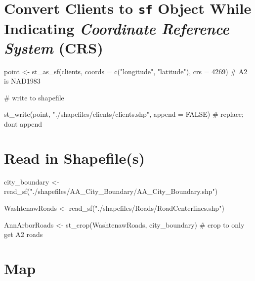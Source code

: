 \documentclass[
  letterpaper,
  DIV=11,
  numbers=noendperiod,
  oneside]{scrreprt}
\newenvironment{Shaded}{\begin{snugshade}}{\end{snugshade}}
\newcommand{\AttributeTok}[1]{\textcolor[rgb]{0.40,0.45,0.13}{#1}}
\newcommand{\CommentTok}[1]{\textcolor[rgb]{0.37,0.37,0.37}{#1}}
\newcommand{\ConstantTok}[1]{\textcolor[rgb]{0.56,0.35,0.01}{#1}}
\newcommand{\DecValTok}[1]{\textcolor[rgb]{0.68,0.00,0.00}{#1}}
\newcommand{\FunctionTok}[1]{\textcolor[rgb]{0.28,0.35,0.67}{#1}}
\newcommand{\NormalTok}[1]{\textcolor[rgb]{0.00,0.23,0.31}{#1}}
\newcommand{\OtherTok}[1]{\textcolor[rgb]{0.00,0.23,0.31}{#1}}
\newcommand{\StringTok}[1]{\textcolor[rgb]{0.13,0.47,0.30}{#1}}
\begin{document}
\section{\texorpdfstring{Convert Clients to \texttt{sf} Object While
Indicating \emph{Coordinate Reference System}
(CRS)}{Convert Clients to sf Object While Indicating Coordinate Reference System (CRS)}}\label{convert-clients-to-sf-object-while-indicating-coordinate-reference-system-crs}

\begin{Shaded}
\begin{Highlighting}[]
\NormalTok{point }\OtherTok{\textless{}{-}} \FunctionTok{st\_as\_sf}\NormalTok{(clients, }
                  \AttributeTok{coords =} \FunctionTok{c}\NormalTok{(}\StringTok{"longitude"}\NormalTok{, }\StringTok{"latitude"}\NormalTok{), }
                  \AttributeTok{crs =} \DecValTok{4269}\NormalTok{) }\CommentTok{\# A2 is NAD1983}

\CommentTok{\# write to shapefile}

\FunctionTok{st\_write}\NormalTok{(point, }
         \StringTok{"./shapefiles/clients/clients.shp"}\NormalTok{,}
         \AttributeTok{append =} \ConstantTok{FALSE}\NormalTok{) }\CommentTok{\# replace; don\textquotesingle{}t append}
\end{Highlighting}
\end{Shaded}

\section{Read in Shapefile(s)}\label{read-in-shapefiles}

\begin{Shaded}
\begin{Highlighting}[]
\NormalTok{city\_boundary }\OtherTok{\textless{}{-}} \FunctionTok{read\_sf}\NormalTok{(}\StringTok{"./shapefiles/AA\_City\_Boundary/AA\_City\_Boundary.shp"}\NormalTok{)}

\NormalTok{WashtenawRoads }\OtherTok{\textless{}{-}} \FunctionTok{read\_sf}\NormalTok{(}\StringTok{"./shapefiles/Roads/RoadCenterlines.shp"}\NormalTok{)}

\NormalTok{AnnArborRoads }\OtherTok{\textless{}{-}} \FunctionTok{st\_crop}\NormalTok{(WashtenawRoads, }
\NormalTok{                         city\_boundary) }\CommentTok{\# crop to only get A2 roads}
\end{Highlighting}
\end{Shaded}

\section{Map}\label{map-1}
\end{document}
